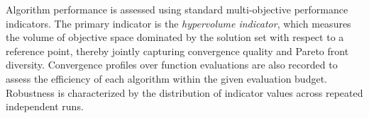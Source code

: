 Algorithm performance is assessed using standard multi-objective performance indicators. The primary indicator is the \emph{hypervolume indicator},
which measures the volume of objective space dominated by the solution set with respect to a reference point, thereby jointly capturing convergence
quality and Pareto front diversity\cite{Audet2018Performance}. Convergence profiles over function evaluations are also recorded to assess the
efficiency of each algorithm within the given evaluation budget. Robustness is characterized by the distribution of indicator values across repeated
independent runs\cite{Trautmann2009Statistical}.







